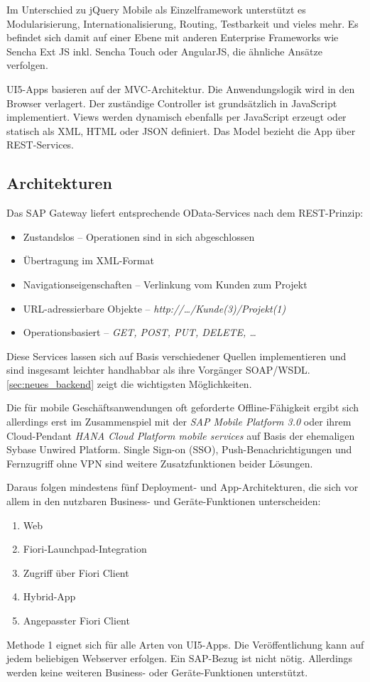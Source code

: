 Im Unterschied zu jQuery Mobile als Einzelframework unterstützt es Modularisierung, Internationalisierung, Routing, Testbarkeit und vieles mehr. Es befindet sich damit auf einer Ebene mit anderen Enterprise Frameworks wie Sencha Ext JS inkl. Sencha Touch oder AngularJS, die ähnliche Ansätze verfolgen.

UI5-Apps basieren auf der \ac{MVC}-Architektur. Die Anwendungslogik wird in den Browser verlagert. Der zuständige Controller ist grundsätzlich in JavaScript implementiert. Views werden dynamisch ebenfalls per JavaScript erzeugt oder statisch als XML, HTML oder JSON definiert. Das Model bezieht die App über \ac{REST}-Services. 


\subsection{Architekturen}
\label{sec:architekturen}
Das SAP Gateway liefert entsprechende OData-Services nach dem REST-Prinzip:

\begin{itemize}
	\item Zustandslos -- Operationen sind in sich abgeschlossen
	\item Übertragung im XML-Format
	\item Navigationseigenschaften -- \zB Verlinkung vom Kunden zum Projekt
	\item URL-adressierbare Objekte -- \zB \textit{http://\dots/Kunde(3)/Projekt(1)}
	\item Operationsbasiert -- \zB \textit{GET, POST, PUT, DELETE, \dots}
\end{itemize}
Diese Services lassen sich auf Basis verschiedener Quellen implementieren und sind insgesamt leichter handhabbar als ihre Vorgänger SOAP/WSDL. \autoref{sec:neues_backend} zeigt die wichtigsten Möglichkeiten.

Die für mobile Geschäftsanwendungen oft geforderte Offline-Fähigkeit ergibt sich allerdings erst im Zusammenspiel mit der \textit{SAP Mobile Platform 3.0} oder ihrem Cloud-Pendant \textit{HANA Cloud Platform mobile services} auf Basis der ehemaligen Sybase Unwired Platform. Single Sign-on (SSO), Push-Benachrichtigungen und Fernzugriff ohne VPN sind weitere Zusatzfunktionen beider Lösungen. 

Daraus folgen mindestens fünf Deployment- und App-Architekturen, die sich vor allem in den nutzbaren Business- und Geräte-Funktionen unterscheiden:
\begin{enumerate}
	\item Web
	\item Fiori-Launchpad-Integration
	\item Zugriff über Fiori Client
	\item Hybrid-App
	\item Angepasster Fiori Client
\end{enumerate}
Methode 1 eignet sich für alle Arten von UI5-Apps. Die Veröffentlichung kann auf jedem beliebigen Webserver erfolgen. Ein SAP-Bezug ist nicht nötig. Allerdings werden keine weiteren Business- oder Geräte-Funktionen unterstützt.

